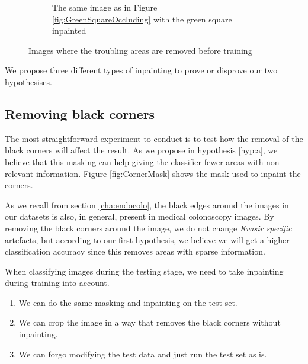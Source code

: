 \begin{figure}
\begin{subfigure}[t]{0.4\textwidth}
         \caption{The same image as in Figure \ref{fig:GreenSquareOccluding} with the green square inpainted}
         \label{fig:GreenSquareOccludingFIX}
     \end{subfigure}
        \caption{Images where the troubling areas are removed before training}
        \label{fig:KvasirAnomaliesFIX}
\end{figure}


We propose three different types of inpainting to prove or disprove our two hypothesises.
\FloatBarrier
\subsection{Removing black corners}
The most straightforward experiment to conduct is to test how the removal of the black corners will affect the result.
As we propose in hypothesis \ref{hyp:a}, we believe that this masking can help giving the classifier fewer areas with non-relevant information.
Figure \ref{fig:CornerMask} shows the mask used to inpaint the corners.

As we recall from section \ref{cha:endocolo}, the black edges around the images in our datasets is also, in general, present in medical colonoscopy images. By removing the black corners around the image, we do not change \textit{Kvasir specific} artefacts, but according to our first hypothesis, we believe we will get a higher classification accuracy since this removes areas with sparse information.

When classifying images during the testing stage, we need to take inpainting during training into account. 
\begin{enumerate}
\item We can do the same masking and inpainting on the test set. 
\item We can crop the image in a way that removes the black corners without inpainting.
\item We can forgo modifying the test data and just run the test set as is. 
\end{enumerate}



